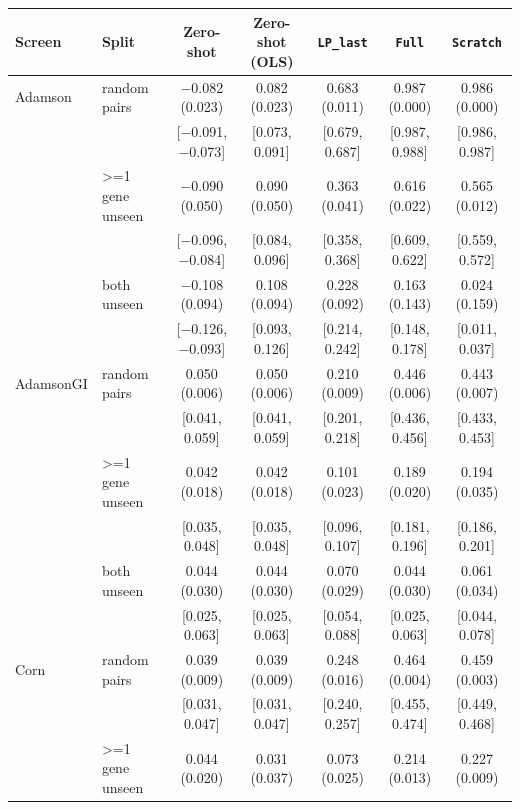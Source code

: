 \begin{tabular}{ll|ccccc}
\hline
Screen & Split & Zero-shot & Zero-shot (OLS) & \texttt{LP\_last} & \texttt{Full} & \texttt{Scratch} \\
\hline
Adamson & random pairs & $-$0.082 (0.023) & 0.082 (0.023) & 0.683 (0.011) & 0.987 (0.000) & 0.986 (0.000) \\
 & & \scriptsize[$-$0.091, $-$0.073] & \scriptsize[0.073, 0.091] & \scriptsize[0.679, 0.687] & \scriptsize[0.987, 0.988] & \scriptsize[0.986, 0.987] \\
 & >=1 gene unseen & $-$0.090 (0.050) & 0.090 (0.050) & 0.363 (0.041) & 0.616 (0.022) & 0.565 (0.012) \\
 & & \scriptsize[$-$0.096, $-$0.084] & \scriptsize[0.084, 0.096] & \scriptsize[0.358, 0.368] & \scriptsize[0.609, 0.622] & \scriptsize[0.559, 0.572] \\
 & both unseen & $-$0.108 (0.094) & 0.108 (0.094) & 0.228 (0.092) & 0.163 (0.143) & 0.024 (0.159) \\
 & & \scriptsize[$-$0.126, $-$0.093] & \scriptsize[0.093, 0.126] & \scriptsize[0.214, 0.242] & \scriptsize[0.148, 0.178] & \scriptsize[0.011, 0.037] \\
\hline
AdamsonGI & random pairs & 0.050 (0.006) & 0.050 (0.006) & 0.210 (0.009) & 0.446 (0.006) & 0.443 (0.007) \\
 & & \scriptsize[0.041, 0.059] & \scriptsize[0.041, 0.059] & \scriptsize[0.201, 0.218] & \scriptsize[0.436, 0.456] & \scriptsize[0.433, 0.453] \\
 & >=1 gene unseen & 0.042 (0.018) & 0.042 (0.018) & 0.101 (0.023) & 0.189 (0.020) & 0.194 (0.035) \\
 & & \scriptsize[0.035, 0.048] & \scriptsize[0.035, 0.048] & \scriptsize[0.096, 0.107] & \scriptsize[0.181, 0.196] & \scriptsize[0.186, 0.201] \\
 & both unseen & 0.044 (0.030) & 0.044 (0.030) & 0.070 (0.029) & 0.044 (0.030) & 0.061 (0.034) \\
 & & \scriptsize[0.025, 0.063] & \scriptsize[0.025, 0.063] & \scriptsize[0.054, 0.088] & \scriptsize[0.025, 0.063] & \scriptsize[0.044, 0.078] \\
\hline
Corn & random pairs & 0.039 (0.009) & 0.039 (0.009) & 0.248 (0.016) & 0.464 (0.004) & 0.459 (0.003) \\
 & & \scriptsize[0.031, 0.047] & \scriptsize[0.031, 0.047] & \scriptsize[0.240, 0.257] & \scriptsize[0.455, 0.474] & \scriptsize[0.449, 0.468] \\
 & >=1 gene unseen & 0.044 (0.020) & 0.031 (0.037) & 0.073 (0.025) & 0.214 (0.013) & 0.227 (0.009) \\

\end{tabular}
